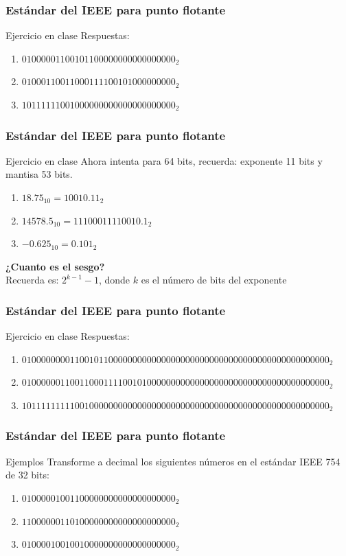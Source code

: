 \documentclass{beamer}
\begin{document}
\begin{frame}
	\frametitle{Estándar del IEEE para punto flotante}
	\begin{block}{Ejercicio en clase}
	Respuestas:
	\begin{enumerate}
		\item $01000001100101100000000000000000_{2}$
		\item $01000110011000111100101000000000_{2}$
		\item $10111111001000000000000000000000_{2}$
	\end{enumerate}	
	\end{block}
\end{frame}

\begin{frame}
	\frametitle{Estándar del IEEE para punto flotante}
	\begin{block}{Ejercicio en clase}
	Ahora intenta para 64 bits, recuerda: exponente 11 bits y mantisa 53 bits.
	\begin{enumerate}
		\item $18.75_{10} = 10010.11_{2}$
		\item $14578.5_{10} = 11100011110010.1_{2} $
		\item $-0.625_{10} = 0.101_{2}$
	\end{enumerate}	
	\end{block}	
	\begin{center}
	\textbf{¿Cuanto es el sesgo?}
	\\Recuerda es: $2^{k-1}-1$, donde $k$ es el número de bits del exponente
	\end{center}
	\end{frame}

\begin{frame}
	\frametitle{Estándar del IEEE para punto flotante}
	\begin{block}{Ejercicio en clase}
	Respuestas:
	\scriptsize{
	\begin{enumerate}
		\item $0100000000110010110000000000000000000000000000000000000000000000_{2}$
		\item $0100000011001100011110010100000000000000000000000000000000000000_{2}$
		\item $1011111111100100000000000000000000000000000000000000000000000000_{2}$
	\end{enumerate}
	}	
	\end{block}
\end{frame}

\begin{frame}
	\frametitle{Estándar del IEEE para punto flotante}
	\begin{block}{Ejemplos}
	Transforme a decimal los siguientes números en el estándar IEEE 754 de 32 bits:
	\begin{enumerate}
		\item $01000001001100000000000000000000_{2}$
		\item $11000000110100000000000000000000_{2}$
		\item $01000010010010000000000000000000_{2}$
	\end{enumerate}	
	\end{block}
\end{frame}
\end{document}
